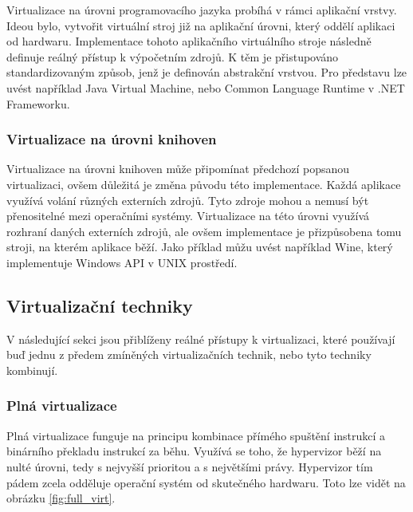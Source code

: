 Virtualizace na úrovni programovacího jazyka probíhá v rámci aplikační vrstvy. Ideou bylo, vytvořit virtuální stroj již na aplikační úrovni, který oddělí aplikaci od hardwaru. Implementace tohoto aplikačního virtuálního stroje následně definuje reálný přístup k výpočetním zdrojů. K těm je přistupováno standardizovaným způsob, jenž je definován abstrakční vrstvou. Pro představu lze uvést například Java Virtual Machine, nebo Common Language Runtime v .NET Frameworku. \cite{chiueh2005survey}


\subsubsection{Virtualizace na úrovni knihoven}

Virtualizace na úrovni knihoven může připomínat předchozí popsanou virtualizaci, ovšem důležitá je změna původu této implementace. Každá aplikace využívá volání různých externích zdrojů. Tyto zdroje mohou a nemusí být přenositelné mezi operačními systémy. Virtualizace na této úrovni využívá rozhraní daných externích zdrojů, ale ovšem implementace je přizpůsobena tomu stroji, na kterém aplikace běží. Jako příklad můžu uvést například Wine, který implementuje Windows API v UNIX prostředí. 


\subsection{Virtualizační techniky}

V následující sekci jsou přiblíženy reálné přístupy k virtualizaci, které používají buď jednu z předem zmíněných virtualizačních technik, nebo tyto techniky kombinují. 

\subsubsection{Plná virtualizace}

Plná virtualizace funguje na principu kombinace přímého spuštění instrukcí a binárního překladu instrukcí za běhu. Využívá se toho, že hypervizor běží na nulté úrovni, tedy s nejvyšší prioritou a s největšími právy. Hypervizor tím pádem zcela odděluje operační systém od skutečného hardwaru. Toto lze vidět na obrázku \ref{fig:full_virt}.\cite{4709159}


